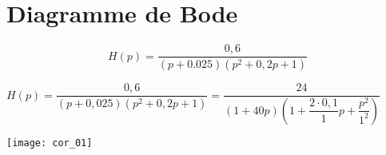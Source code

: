 
\def\xxnumchapitre{Chapitre 2 \vspace{.2cm}}
\def\xxchapitre{\hspace{.12cm} Révisions SLCI}

\def\xxcompetences{%
\textsl{%
\textbf{Savoirs et compétences :}\\
\vspace{-.4cm}
\begin{itemize}[label=\ding{112},font=\color{bleuxp}] 
\item .
\end{itemize}
}}

\def\xxfigures{
}%

\def\xxtitreexo{Exercices d'applicaiton -- Réponses fréquentielles}
\def\xxsourceexo{\hspace{.2cm} \footnotesize{S. Grange}}
\def\xxactivite{{Application 01} \ifprof  -- Corrigé \else \fi}


%

\setlength{\columnseprule}{.1pt}

\pagestyle{fancy}
\thispagestyle{plain}


\vspace{4.5cm}

\def\columnseprulecolor{\color{bleuxp}}
\setlength{\columnseprule}{0.4pt} 

\setcounter{numques}{0}



\section*{Diagramme de Bode}
$$
H(p)=\dfrac{0,6}{(p+0.025)(p^2+0,2p+1)}
$$

\ifprof
\begin{corrige}
$H(p)=\dfrac{0,6}{(p+0,025)(p^2+0,2p+1)}=\dfrac{24}{(1+40p)\left(1+\dfrac{2\cdot 0,1}{1} p+\dfrac{p^2}{1^2}\right)}$
\end{corrige}
\begin{center}
\texttt{[image: cor\_01]}
\end{center}


